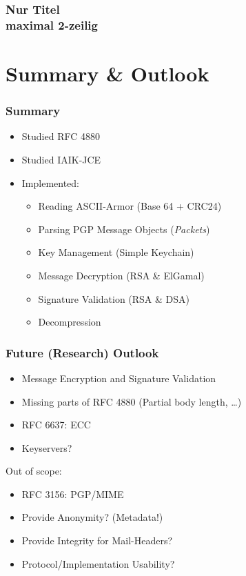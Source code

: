\documentclass{beamer}
\begin{document}
\begin{frame}
	\frametitle{Nur Titel \\maximal 2-zeilig}
\end{frame}



\section{Summary \&{} Outlook}

\begin{frame}
	\frametitle{Summary}
	
	\begin{itemize}
		\item Studied RFC 4880
		\item Studied IAIK-JCE
		\item Implemented:
		\begin{itemize}
			\item Reading ASCII-Armor (Base 64 + CRC24)
			\item Parsing PGP Message Objects (\textit{Packets})
			\item Key Management (Simple Keychain)
			\item Message Decryption (RSA \&{} ElGamal)
			\item Signature Validation (RSA \&{} DSA)
			\item Decompression
		\end{itemize}
	\end{itemize}
	
\end{frame}


\begin{frame}
	\frametitle{Future (Research) Outlook}
	
	\begin{itemize}
		\item Message Encryption and Signature Validation
		\item Missing parts of RFC 4880 (Partial body length, \ldots)
		\item RFC 6637: ECC
		\item Keyservers?
	\end{itemize}
	Out of scope:
	\begin{itemize}
	    \item RFC 3156: PGP/MIME
		\item Provide Anonymity? (Metadata!)%
		\item Provide Integrity for Mail-Headers?
		\item Protocol/Implementation Usability?
	\end{itemize}
	
\end{frame}
\end{document}
